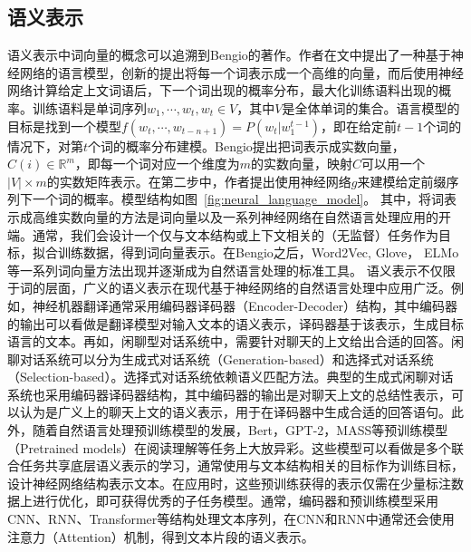 \subsection{语义表示}
语义表示中词向量的概念可以追溯到Bengio的著作\cite{ bengio2003neural}。作者在文中提出了一种基于神经网络的语言模型，创新的提出将每一个词表示成一个高维的向量，而后使用神经网络计算给定上文词语后，下一个词出现的概率分布，最大化训练语料出现的概率。训练语料是单词序列$w_1, \cdots, w_t, w_t \in V$，其中$V$是全体单词的集合。语言模型的目标是找到一个模型$f(w_t, \cdots, w_{t-n+1}) = P(w_t|w_1 ^ {t-1})$，即在给定前$t-1$个词的情况下，对第$t$个词的概率分布建模。Bengio提出把词表示成实数向量，$C(i) \in \mathbb{R}^m$，即每一个词对应一个维度为$m$的实数向量，映射$C$可以用一个$|V| \times m$的实数矩阵表示。在第二步中，作者提出使用神经网络$g$来建模给定前缀序列下一个词的概率。模型结构如图~\ref{fig:neural_language_model}。
其中，将词表示成高维实数向量的方法是词向量以及一系列神经网络在自然语言处理应用的开端。通常，我们会设计一个仅与文本结构或上下文相关的（无监督）任务作为目标，拟合训练数据，得到词向量表示。在Bengio之后，Word2Vec\cite{ mikolov2013distributed}, Glove\cite{ pennington2014glove}， ELMo\cite{ peters2018deep}等一系列词向量方法出现并逐渐成为自然语言处理的标准工具。
语义表示不仅限于词的层面，广义的语义表示在现代基于神经网络的自然语言处理中应用广泛。例如，神经机器翻译通常采用编码器译码器（Encoder-Decoder）\cite{ sutskever2014sequence}结构，其中编码器的输出可以看做是翻译模型对输入文本的语义表示，译码器基于该表示，生成目标语言的文本。再如，闲聊型对话系统中，需要针对聊天的上文给出合适的回答。闲聊对话系统可以分为生成式对话系统（Generation-based）\cite{ shang2015neural}和选择式对话系统（Selection-based）\cite{ chen2017survey}。选择式对话系统依赖语义匹配方法。典型的生成式闲聊对话系统也采用编码器译码器结构，其中编码器的输出是对聊天上文的总结性表示，可以认为是广义上的聊天上文的语义表示，用于在译码器中生成合适的回答语句。此外，随着自然语言处理预训练模型的发展，Bert\cite{devlin2018bert}，GPT-2\cite{ radford2019language}，MASS\cite{ song2019mass}等预训练模型（Pretrained models）在阅读理解等任务上大放异彩。这些模型可以看做是多个联合任务共享底层语义表示的学习，通常使用与文本结构相关的目标作为训练目标，设计神经网络结构表示文本。在应用时，这些预训练获得的表示仅需在少量标注数据上进行优化，即可获得优秀的子任务模型。通常，编码器和预训练模型采用CNN、RNN、Transformer等结构处理文本序列，在CNN和RNN中通常还会使用注意力（Attention）机制，得到文本片段的语义表示。

